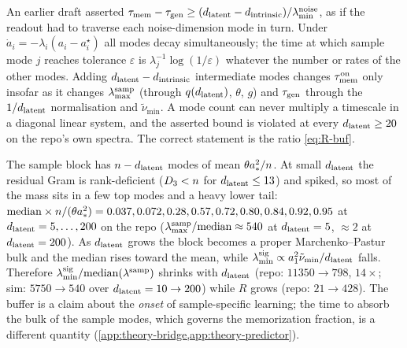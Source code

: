 \begin{remark}\label{rem:nonsequitur-buf}
An earlier draft asserted $\tau_{\mathrm{mem}}-\tau_{\mathrm{gen}}\ge(d_{\mathrm{latent}}-d_{\mathrm{intrinsic}})/\lambda^{\rm noise}_{\min}$, as if the readout had to traverse each noise-dimension mode in turn. Under $\dot a_i=-\lambda_i(a_i-a_i^\star)$ all modes decay simultaneously; the time at which sample mode $j$ reaches tolerance $\varepsilon$ is $\lambda_j^{-1}\log(1/\varepsilon)$ whatever the number or rates of the other modes. Adding $d_{\mathrm{latent}}-d_{\mathrm{intrinsic}}$ intermediate modes changes $\tau_{\mathrm{mem}}^{\rm on}$ only insofar as it changes $\lambda^{\rm samp}_{\max}$ (through $q(d_{\mathrm{latent}})$, $\theta$, $g$) and $\tau_{\mathrm{gen}}$ through the $1/d_{\mathrm{latent}}$ normalisation and $\tilde\nu_{\min}$. A mode count can never multiply a timescale in a diagonal linear system, and the asserted bound is violated at every $d_{\mathrm{latent}}\ge20$ on the repo's own spectra. The correct statement is the ratio \eqref{eq:R-buf}.
\end{remark}

\begin{remark}\label{rem:median-buf}
The sample block has $n-d_{\mathrm{latent}}$ modes of mean $\theta a_*^2/n$. At small $d_{\mathrm{latent}}$ the residual Gram is rank-deficient ($D_3<n$ for $d_{\mathrm{latent}}\le13$) and spiked, so most of the mass sits in a few top modes and a heavy lower tail: $\mathrm{median}\times n/(\theta a_*^2)=0.037,0.072,0.28,0.57,0.72,0.80,0.84,0.92,0.95$ at $d_{\mathrm{latent}}=5,\dots,200$ on the repo ($\lambda^{\rm samp}_{\max}/\mathrm{median}\approx540$ at $d_{\mathrm{latent}}=5$, $\approx2$ at $d_{\mathrm{latent}}=200$). As $d_{\mathrm{latent}}$ grows the block becomes a proper Marchenko--Pastur bulk and the median rises toward the mean, while $\lambda^{\rm sig}_{\min}\propto a_1^2\tilde\nu_{\min}/d_{\mathrm{latent}}$ falls. Therefore $\lambda^{\rm sig}_{\min}/\mathrm{median}(\lambda^{\rm samp})$ shrinks with $d_{\mathrm{latent}}$ (repo: $11350\to798$, $14\times$; sim: $5750\to540$ over $d_{\mathrm{latent}}=10\to200$) while $R$ grows (repo: $21\to428$). The buffer is a claim about the \emph{onset} of sample-specific learning; the time to absorb the bulk of the sample modes, which governs the memorization fraction, is a different quantity (\cref{app:theory-bridge,app:theory-predictor}).
\end{remark}

